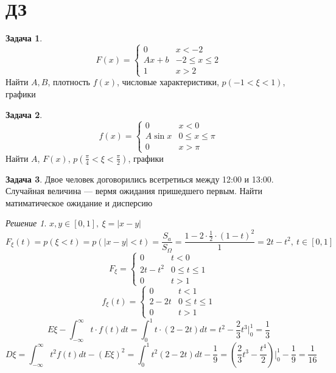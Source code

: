 \documentclass[english]{article}
\theoremstyle{plain}
\theoremstyle{remark}
\newtheorem*{solution}{Решение}
\theoremstyle{definition}
\newtheorem{task}{Задача}
\begin{document}
\section{ДЗ}
\label{sec:org80ccb40}
\begin{task}
\[ F(x) = \begin{cases}
0 & x < -2 \\
Ax + b & -2 \le x \le 2 \\
1 & x > 2
\end{cases}\]
Найти \(A, B\),  плотность \(f(x)\), числовые характеристики, \(p(-1 < \xi < 1)\), графики
\end{task}
\begin{task}
\[ f(x) = \begin{cases}
0 & x < 0 \\
A \sin x & 0 \le x \le \pi \\
0 & x > \pi
\end{cases}\]
Найти \(A\), \(F(x)\), \(p(\frac{\pi}{4} < \xi < \frac{\pi}{2})\), графики
\end{task}
\begin{task}
Двое человек договорились всетретиься между 12:00 и 13:00. Случайная
величина --- вермя ожидания пришедшего первым. Найти матиматическое
ожидание и дисперсию
\end{task}
\begin{solution}
\(x, y \in [0, 1],\ \xi = |x - y|\)
\[ F_\xi(t) = p(\xi < t) = p(|x - y| < t) =\frac{S_a}{S_\Omega} = \frac{1 - 2\cdot\frac{1}{2}\cdot(1 - t)^2}{1} = 2t - t^2,\ t \in [0, 1] \]
\[ F_\xi = \begin{cases} 0 & t < 0 \\ 2t - t^2 & 0 \le t \le 1 \\ 0 & t > 1\end{cases} \]
\[ f_\xi(t) = \begin{cases} 0 & t < 1 \\ 2 - 2t & 0 \le t \le 1 \\ 0 & t > 1 \end{cases} \]
\[ E\xi - \int_{-\infty}^\infty t \cdot f(t) dt = \int_0^1 t\cdot(2 - 2t)dt = t^2 - \frac{2}{3} t^3 \bigg|^1_0 = \frac{1}{3} \]
\[ D\xi = \int_{-\infty}^\infty t^2 f(t) dt - (E\xi)^2 = \int_0^1 t^2(2 - 2t)dt - \frac{1}{9} = (\frac{2}{3}t^3 - \frac{t^4}{2})\bigg|^1_0 - \frac{1}{9} = \frac{1}{16} \]
\end{solution}
\end{document}
